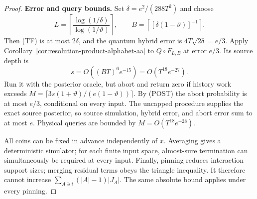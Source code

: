 \begin{proof}
\textbf{Error and query bounds.}
Set \(\delta=e^2/(288T^2)\) and choose
\[
 L=\left\lceil\frac{\log(1/\delta)}{\log(1/\vartheta)}\right\rceil,
 \qquad B=\left\lceil[\delta(1-\vartheta)]^{-1}\right\rceil.
\]
Then (TF) is at most \(2\delta\), and the quantum hybrid error is
\(4T\sqrt{2\delta}=e/3\). Apply
Corollary~\ref{cor:resolution-product-alphabet-aa} to
\(Q\circ F_{L,B}\) at error \(e/3\). Its source depth is
\[
 s=O((BT)^6e^{-15})=O(T^{18}e^{-27}).
\]
Run it with the posterior oracle, but abort and return zero if history
work exceeds
\(M=\lceil3s(1+\vartheta)/(e(1-\vartheta))\rceil\).
By (POST) the abort probability is at most \(e/3\), conditional on
every input. The uncapped procedure supplies the exact source
posterior, so source simulation, hybrid error, and abort error sum to
at most \(e\). Physical queries are bounded by
\(M=O(T^{18}e^{-28})\).

All coins can be fixed in advance independently of \(x\). Averaging
gives a deterministic simulator; for each finite input space,
almost-sure termination can simultaneously be required at every input.
Finally, pinning reduces interaction support sizes; merging residual
terms obeys the triangle inequality. It therefore cannot increase
\(\sum_{A\ni i}(|A|-1)|J_A|\). The same absolute bound applies
under every pinning.
\end{proof}

